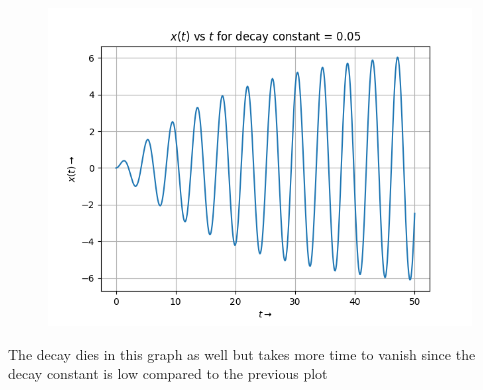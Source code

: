 \documentclass[12pt, a4paper]{article}
\begin{document}
\begin{figure}[H]
    \centering
    \includegraphics[scale = 0.8]{Figure_2.png}
    \label{fig:sample}
\end{figure}
\begin{center}
    The decay dies in this graph as well but takes more time to vanish since the
decay constant is low compared to the previous plot
\end{center}
\end{document}
